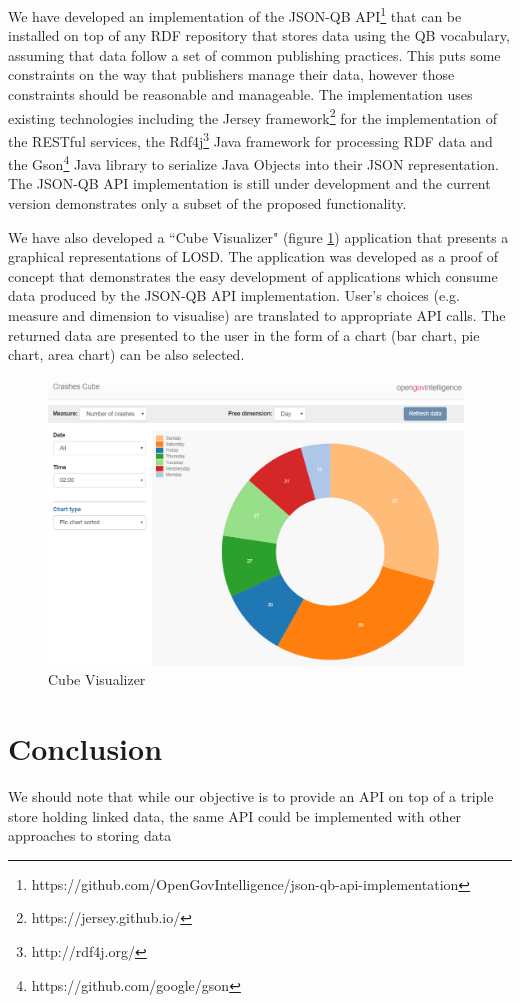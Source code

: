 \documentclass{llncs}
\begin{document}
We have developed an implementation of the JSON-QB API\footnote{https://github.com/OpenGovIntelligence/json-qb-api-implementation} that can be installed on top of any RDF repository that stores data using the QB vocabulary, assuming that data follow a set of common publishing practices. This puts some constraints on the way that publishers manage their data, however those constraints should be reasonable and manageable. The implementation uses existing technologies including the Jersey framework\footnote{https://jersey.github.io/} for the implementation of the RESTful services, the Rdf4j\footnote{http://rdf4j.org/} Java framework for processing RDF data and the Gson\footnote{https://github.com/google/gson} Java library to serialize Java Objects into their JSON representation. The JSON-QB API implementation is still under development and the current version demonstrates only a subset of the proposed functionality.

We have also developed a ``Cube Visualizer" (figure \ref{fig:cubeVisualizer}) application that presents a graphical representations of LOSD. The application was developed as a proof of concept that demonstrates the easy development of applications which consume data produced by the JSON-QB API implementation. User’s choices (e.g. measure and dimension to visualise) are translated to appropriate API calls. The returned data are presented to the user in the form of a chart (bar chart, pie chart,  area chart) can be also selected.


\begin{figure}[h!]
  \includegraphics[width=110mm]{images/cubeVisualizer.png}
\caption{Cube Visualizer}
\label{fig:cubeVisualizer}
\end{figure}


\section{Conclusion}\label{sec:conclusion}

We should note that while our objective is to provide an API on top of a triple store holding linked data, the same API could be implemented with other approaches to storing data










\end{document}
